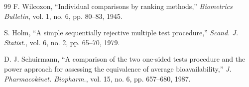\documentclass[conference]{IEEEtran}
\begin{document}
\begin{thebibliography}{99}
F. Wilcoxon, ``Individual comparisons by ranking methods,'' \emph{Biometrics Bulletin}, vol. 1, no. 6, pp. 80--83, 1945.

S. Holm, ``A simple sequentially rejective multiple test procedure,'' \emph{Scand. J. Statist.}, vol. 6, no. 2, pp. 65--70, 1979.

D. J. Schuirmann, ``A comparison of the two one-sided tests procedure and the power approach for assessing the equivalence of average bioavailability,'' \emph{J. Pharmacokinet. Biopharm.}, vol. 15, no. 6, pp. 657--680, 1987.

\end{thebibliography}
\end{document}
